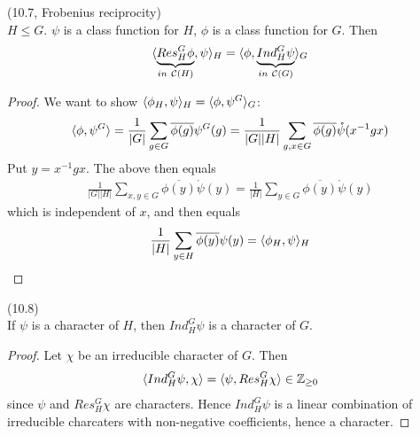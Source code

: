 \documentclass[a4paper]{article}
\begin{document}
\begin{thm} (10.7, Frobenius reciprocity)\\
$H \leq G$. $\psi$ is a class function for $H$, $\phi$ is a class function for $G$. Then
\begin{equation*}
\begin{aligned}
\langle \underbrace{Res_H^G \phi}_{in\ \mathcal{C}(H)} , \psi\rangle_H = \langle\phi,\underbrace{Ind_H^G \psi}_{in\ \mathcal{C}(G)}\rangle_G
\end{aligned}
\end{equation*}
\begin{proof}
We want to show $\langle \phi_H,\psi\rangle_H =\langle \phi,\psi^G \rangle_G$:
\begin{equation*}
\begin{aligned}
\langle \phi,\psi^G \rangle = \frac{1}{|G|} \sum_{g \in G} \overline{\phi(g)} \psi^G (g) =\frac{1}{|G||H|} \sum_{g,x \in G} \overline{\phi(g)} \mathring{\psi} (x^{-1}gx)
\end{aligned}
\end{equation*}
Put $y=x^{-1}gx$. The above then equals
\begin{equation*}
\begin{aligned}
\frac{1}{|G||H|} \sum_{x,y \in G} \overline{\phi(y)} \mathring{\psi}(y) = \frac{1}{|H|} \sum_{y \in G} \overline{\phi(y)} \mathring{\psi}(y)
\end{aligned}
\end{equation*}
which is independent of $x$, and then equals
\begin{equation*}
\begin{aligned}
\frac{1}{|H|} \sum_{y \in H} \overline{\phi(y)} \psi(y) = \langle \phi_H,\psi\rangle_H
\end{aligned}
\end{equation*}
\end{proof}
\end{thm}

\begin{coro} (10.8)\\
If $\psi$ is a character of $H$, then $Ind_H^G \psi$ is a character of $G$.
\begin{proof}
Let $\chi$ be an irreducible character of $G$. Then
\begin{equation*}
\begin{aligned}
\langle Ind_H^G \psi,\chi\rangle = \langle \psi,Res_H^G \chi\rangle \in \mathbb{Z}_{\geq 0}
\end{aligned}
\end{equation*}
since $\psi$ and $Res_H^G \chi$ are characters. Hence $Ind_H^G \psi$ is a linear combination of irreducible charcaters with non-negative coefficients, hence a character.
\end{proof}
\end{coro}
\end{document}
